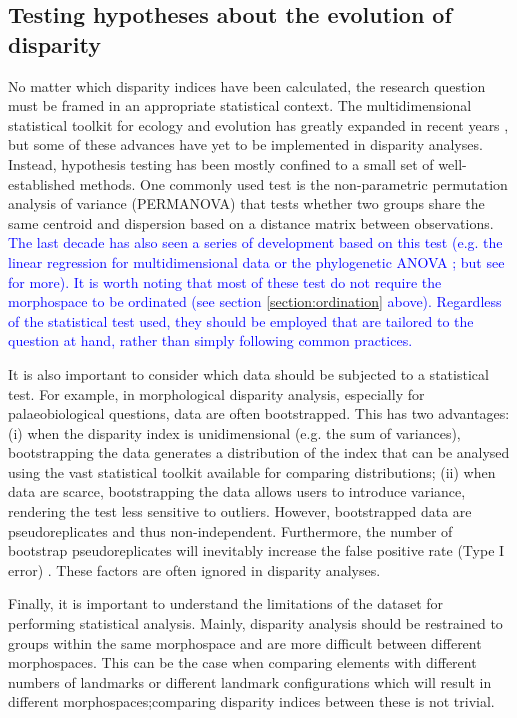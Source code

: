 \documentclass[12pt,letterpaper]{article}
\begin{document}
\subsection{Testing hypotheses about the evolution of disparity} \label{section:testing}

No matter which disparity indices have been calculated, the research question must be framed in an appropriate statistical context.
The multidimensional statistical toolkit for ecology and evolution has greatly expanded in recent years \citep{clavel2015mvmorph, Adams2018}, but some of these advances have yet to be implemented in disparity analyses.
Instead, hypothesis testing has been mostly confined to a small set of well-established methods.
One commonly used test is the non-parametric permutation analysis of variance (PERMANOVA) \citep{Anderson2001} that tests whether two groups share the same centroid and dispersion based on a distance matrix between observations.
\textcolor{blue}{The last decade has also seen a series of development based on this test (e.g. the linear regression for multidimensional data \citealt{collyer2015method} or the phylogenetic ANOVA \citealt{Adams2014}; but see \citealt{Adams2018,lloyd2016} for more).
It is worth noting that most of these test do not require the morphospace to be ordinated (see section \ref{section:ordination} above).
Regardless of the statistical test used, they should be employed that are tailored to the question at hand, rather than simply following common practices.}

It is also important to consider which data should be subjected to a statistical test.
For example, in morphological disparity analysis, especially for palaeobiological questions, data are often bootstrapped.
This has two advantages: (i) when the disparity index is unidimensional (e.g.
the sum of variances), bootstrapping the data generates a distribution of the index that can be analysed using the vast statistical toolkit available for comparing distributions; (ii) when data are scarce, bootstrapping the data allows users to introduce variance, rendering the test less sensitive to outliers.
However, bootstrapped data are pseudoreplicates and thus non-independent.
Furthermore, the number of bootstrap pseudoreplicates will inevitably increase the false positive rate (Type I error) \citep{strube1988bootstrap}.
These factors are often ignored in disparity analyses.

Finally, it is important to understand the limitations of the dataset for performing statistical analysis.
Mainly, disparity analysis should be restrained to groups within the same morphospace and are more difficult between different morphospaces.
This can be the case when comparing elements with different numbers of landmarks or different landmark configurations which will result in different morphospaces;comparing disparity indices between these is not trivial.
\end{document}
